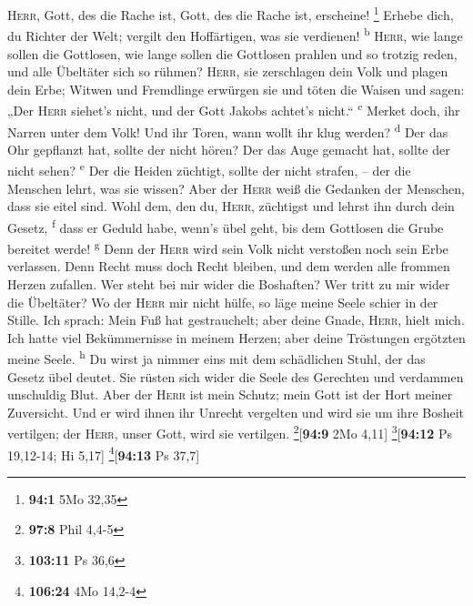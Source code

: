  \textsc{Herr}, Gott, des die Rache ist, Gott, des die
Rache ist, erscheine! \footnote{\textbf{94:1} 5Mo 32,35} 
Erhebe dich, du Richter der Welt; vergilt den Hoffärtigen, was sie
verdienen! \textsuperscript{b}  \textsc{Herr}, wie lange
sollen die Gottlosen, wie lange sollen die Gottlosen prahlen
 und so trotzig reden, und alle Übeltäter sich so rühmen?
 \textsc{Herr}, sie zerschlagen dein Volk und plagen dein
Erbe;  Witwen und Fremdlinge erwürgen sie und töten die
Waisen  und sagen: „Der \textsc{Herr} siehet's nicht, und
der Gott Jakobs achtet's nicht.`` \textsuperscript{c} 
Merket doch, ihr Narren unter dem Volk! Und ihr Toren, wann wollt ihr
klug werden? \textsuperscript{d}  Der das Ohr gepflanzt
hat, sollte der nicht hören? Der das Auge gemacht hat, sollte der nicht
sehen? \textsuperscript{e}  Der die Heiden züchtigt,
sollte der nicht strafen, -- der die Menschen lehrt, was sie wissen?
 Aber der \textsc{Herr} weiß die Gedanken der Menschen,
dass sie eitel sind.  Wohl dem, den du, \textsc{Herr},
züchtigst und lehrst ihn durch dein Gesetz, \textsuperscript{f}
 dass er Geduld habe, wenn's übel geht, bis dem Gottlosen
die Grube bereitet werde! \textsuperscript{g}  Denn der
\textsc{Herr} wird sein Volk nicht verstoßen noch sein Erbe verlassen.
 Denn Recht muss doch Recht bleiben, und dem werden alle
frommen Herzen zufallen.  Wer steht bei mir wider die
Boshaften? Wer tritt zu mir wider die Übeltäter?  Wo der
\textsc{Herr} mir nicht hülfe, so läge meine Seele schier in der Stille.
 Ich sprach: Mein Fuß hat gestrauchelt; aber deine Gnade,
\textsc{Herr}, hielt mich.  Ich hatte viel Bekümmernisse
in meinem Herzen; aber deine Tröstungen ergötzten meine Seele.
\textsuperscript{h}  Du wirst ja nimmer eins mit dem
schädlichen Stuhl, der das Gesetz übel deutet.  Sie
rüsten sich wider die Seele des Gerechten und verdammen unschuldig Blut.
 Aber der \textsc{Herr} ist mein Schutz; mein Gott ist
der Hort meiner Zuversicht.  Und er wird ihnen ihr
Unrecht vergelten und wird sie um ihre Bosheit vertilgen; der
\textsc{Herr}, unser Gott, wird sie vertilgen.
\footnote{\textbf{97:8} Phil 4,4-5}{[}\textbf{94:9} 2Mo 4,11{]}
\footnote{\textbf{103:11} Ps 36,6}{[}\textbf{94:12} Ps 19,12-14; Hi
5,17{]} \footnote{\textbf{106:24} 4Mo 14,2-4}{[}\textbf{94:13} Ps
37,7{]}

